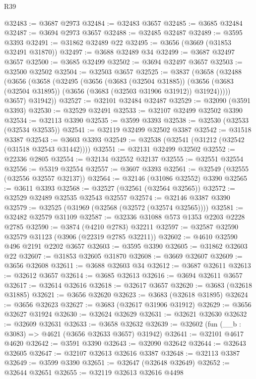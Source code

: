 \begin{lexlean}{R39}
\begin{coremodule}
@32483 := @3687 @2973
@32484 := @32483 @3657
@32485 := @3685 @32484
@32487 := @3694 @2973 @3657
@32488 := @32485 @32487
@32489 := @3595 @3393
@32491 := @31862 @32489 @22
@32495 := @3656 (@3669 (@31853 @32491 @31870))
@32497 := @3688 @32489 @34
@32499 := @3687 @32497 @3657
@32500 := @3685 @32499
@32502 := @3694 @32497 @3657
@32503 := @32500 @32502
@32504 := @32503 @3657
@32525 := @3837
    (@3658
      (@32488
        (@3656
          (@3658
            (@32495
              (@3656
                (@3683 (@32504 @31885))
                (@3656 (@3683 (@32504 @31895)) (@3656 (@3683 (@32503 @31906 @31912)) @31924)))))
          @3657)
        @31942))
@32527 := @32101 @32484 @32487
@32529 := @32090 (@3591 @3393)
@32530 := @32529 @32491
@32533 := @32107 @32499 @32502 @3390
@32534 := @32113 @3390
@32535 := @3599 @3393
@32538 := @32530 (@32533 (@32534 @32535))
@32541 := @32119 @32499 @32502 @3387
@32542 := @31518 @3387
@32543 := @3603 @3393
@32549 := @32538 (@32541 (@31212 (@32542 (@31518 @32543 @31442))))
@32551 := @32131 @32499 @32502
@32552 := @22336 @2805
@32554 := @32134 @32552 @32137
@32555 := @32551 @32554
@32556 := @5319 @32554
@32557 := @3607 @3393
@32561 := @32549 (@32555 (@32556 @32557 @32137))
@32564 := @32146 (@31086 @32552) @3390
@32565 := @3611 @3393
@32568 := @32527 (@32561 (@32564 @32565))
@32572 := @32529 @32489 @32535 @32543 @32557
@32574 := @32146 @3387 @3390
@32579 := @32525 (@31969 (@32568 (@32572 (@32574 @32565))))
@32581 := @32482 @32579 @31109
@32587 := @32336 @31088 @573 @1353 @2203 @2228 @2785
@32590 := @3874 (@4210 @2783) @32211
@32597 := @32587 @32590 @32579 @31123 (@3906 (@22319 @2785 @32211))
@32602 := @4610 @32590 @496 @2191 @2202 @3657
@32603 := @3595 @3390
@32605 := @31862 @32603 @22
@32607 := @31853 @32605 @31870
@32608 := @3669 @32607
@32609 := @3656 @32608
@32611 := @3688 @32603 @34
@32612 := @3687 @32611
@32613 := @32612 @3657
@32614 := @3685 @32613
@32616 := @3694 @32611 @3657
@32617 := @32614 @32616
@32618 := @32617 @3657
@32620 := @3683 (@32618 @31885)
@32621 := @3656 @32620
@32623 := @3683 (@32618 @31895)
@32624 := @3656 @32623
@32627 := @3683 (@32617 @31906 @31912)
@32629 := @3656 @32627 @31924
@32630 := @32624 @32629
@32631 := @32621 @32630
@32632 := @32609 @32631
@32633 := @3658 @32632
@32639 := @32602 (fun (__b : @3083) => @4621 (@3656 @32633 @3657) @31942)
@32641 := @32101 @4617 @4620
@32642 := @3591 @3390
@32643 := @32090 @32642
@32644 := @32643 @32605
@32647 := @32107 @32613 @32616 @3387
@32648 := @32113 @3387
@32649 := @3599 @3390
@32651 := @32647 (@32648 @32649)
@32652 := @32644 @32651
@32655 := @32119 @32613 @32616 @4498

\end{coremodule}
\end{lexlean}
